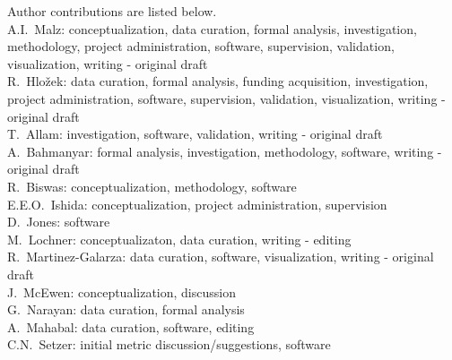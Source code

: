 Author contributions are listed below. \\
A.I.~Malz: conceptualization, data curation, formal analysis, investigation, methodology, project administration, software, supervision, validation, visualization, writing - original draft \\
R.~Hlo\v{z}ek: data curation, formal analysis, funding acquisition, investigation, project administration, software, supervision, validation, visualization, writing - original draft \\
T.~Allam: investigation, software, validation, writing - original draft \\
A.~Bahmanyar: formal analysis, investigation, methodology, software, writing - original draft \\
R.~Biswas: conceptualization, methodology, software \\
E.E.O.~Ishida: conceptualization, project administration, supervision \\
D.~Jones: software \\
M.~Lochner: conceptualizaton, data curation, writing - editing \\
R.~Martinez-Galarza: data curation, software, visualization, writing - original draft \\
J.~McEwen: conceptualization, discussion\\
G.~Narayan: data curation, formal analysis \\
A.~Mahabal: data curation, software, editing \\
C.N.~Setzer: initial metric discussion/suggestions, software \\
